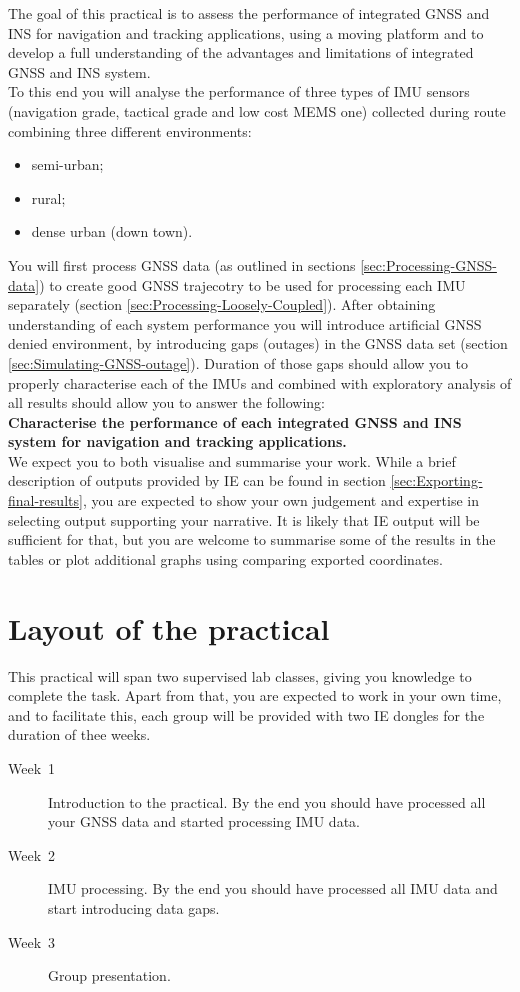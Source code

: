 \documentclass[british,DIV=calc, paper=a4, fontsize=12pt, onecolumn]{scrartcl}
\begin{document}
The goal of this practical is to assess the performance of integrated GNSS and INS for navigation and tracking applications, using a moving platform and to develop a full understanding of the advantages and limitations of integrated GNSS and INS system.\\
To this end you will analyse the performance of three types of IMU sensors (navigation grade, tactical grade and low cost MEMS one) collected during route combining three different environments:
\begin{itemize}
	\item semi-urban;
	\item rural;
	\item dense urban (down town).
\end{itemize}
You will first process GNSS data (as outlined in sections \ref{sec:Processing-GNSS-data}) to create good GNSS trajecotry to be used for processing each IMU separately (section \ref{sec:Processing-Loosely-Coupled}). After obtaining understanding of each system performance you will introduce artificial GNSS denied environment, by introducing gaps (outages) in the GNSS data set (section \ref{sec:Simulating-GNSS-outage}). Duration of those gaps should allow you to properly characterise each of the IMUs and combined with exploratory analysis of all results should allow you to answer the following:\\
\textbf{Characterise the performance of each integrated GNSS and INS system for navigation and tracking applications.}\\
We expect you to both visualise and summarise your work. While a brief description of outputs provided by IE can be found in section \ref{sec:Exporting-final-results}, you are expected to show your own judgement and expertise in selecting output supporting your narrative. It is likely that IE output will be sufficient for that, but you are welcome to summarise some of the results in the tables or plot additional graphs using comparing exported coordinates.

\section{Layout of the practical}
This practical will span two supervised lab classes, giving you knowledge to complete the task. Apart from that, you are expected to work in your own time, and to facilitate this, each group will be provided with two IE dongles for the duration of thee weeks.
\begin{description}
	\item [{Week~1}] Introduction to the practical. By the end you should
	have processed all your GNSS data and started processing IMU data.
	\item [{Week~2}] IMU processing. By the end you should have processed
	all IMU data and start introducing data gaps.
	\item [{Week~3}] Group presentation.
\end{description}
\end{document}
